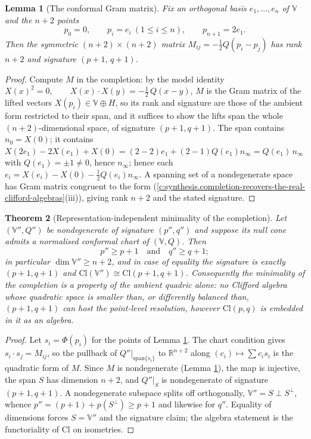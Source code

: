 \documentclass[11pt]{article}
\newtheorem{theorem}{Theorem}[section]
\newtheorem{lemma}[theorem]{Lemma}
\theoremstyle{definition}
\theoremstyle{plain}
\providecommand{\Cl}{}\renewcommand{\Cl}{\mathrm{Cl}}
\providecommand{\R}{}\renewcommand{\R}{\mathbb{R}}
\providecommand{\nInf}{}\renewcommand{\nInf}{n_\infty}
\providecommand{\nO}{}\renewcommand{\nO}{n_0}
\begin{document}
\begin{lemma}[The conformal Gram matrix]\label{c:transport.conformal-gram-matrix}
Fix an orthogonal basis $e_1, \dots, e_n$ of $\mathbb{V}$ and the $n + 2$ points
\[
p_0 = 0, \qquad p_i = e_i \ (1 \leq i \leq n), \qquad p_{n+1} = 2e_1 .
\]
Then the symmetric $(n{+}2) \times (n{+}2)$ matrix $M_{ij} = -\tfrac12 Q(p_i - p_j)$ has rank $n + 2$ and signature $(p{+}1,\, q{+}1)$.
\end{lemma}
\begin{proof}
Compute $M$ in the completion: by the model identity $X(x)^2 = 0, \qquad X(x)\cdot X(y) = -\tfrac12\, Q(x-y)$, $M$ is the Gram matrix of the lifted vectors $X(p_i) \in \mathbb{V} \oplus H$, so its rank and signature are those of the ambient form restricted to their span, and it suffices to show the lifts span the whole $(n{+}2)$-dimensional space, of signature $(p{+}1, q{+}1)$. The span contains $\nO = X(0)$; it contains $X(2e_1) - 2X(e_1) + X(0) = (2 - 2)e_1 + (2 - 1)Q(e_1)\nInf = Q(e_1)\,\nInf$ with $Q(e_1) = \pm 1 \neq 0$, hence $\nInf$; hence each $e_i = X(e_i) - X(0) - \tfrac12 Q(e_i)\nInf$. A spanning set of a nondegenerate space has Gram matrix congruent to the form (\ref{c:synthesis.completion-recovers-the-real-clifford-algebras}(iii)), giving rank $n+2$ and the stated signature.

\end{proof}

\begin{theorem}[Representation-independent minimality of the completion]\label{c:transport.representation-independent-minimality-completion}
Let $(\mathbb{V}'', Q'')$ be nondegenerate of signature $(p'', q'')$ and suppose its null cone admits a normalised conformal chart of $(\mathbb{V}, Q)$. Then
\[
p'' \geq p + 1 \quad \text{and} \quad q'' \geq q + 1 ;
\]
in particular $\dim \mathbb{V}'' \geq n + 2$, and in case of equality the signature is exactly $(p{+}1, q{+}1)$ and $\Cl(\mathbb{V}'') \cong \Cl(p{+}1, q{+}1)$. Consequently the minimality of the completion is a property of the ambient quadric alone: no Clifford algebra whose quadratic space is smaller than, or differently balanced than, $(p{+}1, q{+}1)$ can host the point-level resolution, \emph{however} $\Cl(p,q)$ is embedded in it as an algebra.
\end{theorem}
\begin{proof}
Let $s_i = \Phi(p_i)$ for the points of Lemma \ref{c:transport.conformal-gram-matrix}. The chart condition gives $s_i \cdot s_j = M_{ij}$, so the pullback of $Q''|_{\mathrm{span}\{s_i\}}$ to $\R^{n+2}$ along $(c_i) \mapsto \sum c_i s_i$ is the quadratic form of $M$. Since $M$ is nondegenerate (Lemma \ref{c:transport.conformal-gram-matrix}), the map is injective, the span $S$ has dimension $n+2$, and $Q''|_S$ is nondegenerate of signature $(p{+}1, q{+}1)$. A nondegenerate subspace splits off orthogonally, $\mathbb{V}'' = S \perp S^\perp$, whence $p'' = (p{+}1) + p(S^\perp) \geq p+1$ and likewise for $q''$. Equality of dimensions forces $S = \mathbb{V}''$ and the signature claim; the algebra statement is the functoriality of $\Cl$ on isometries.

\end{proof}
\end{document}
